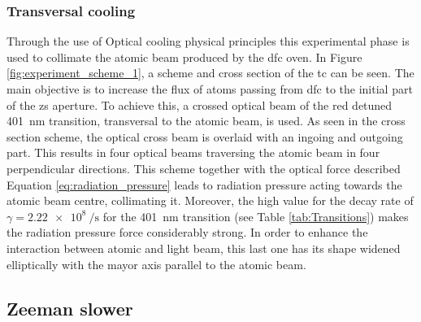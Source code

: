 \subsubsection{Transversal cooling}

Through the use of Optical cooling physical principles this experimental phase is used to collimate the atomic beam produced by the \ac{dfc} oven. In Figure \ref{fig:experiment_scheme_1}, a scheme and cross section of the \ac{tc} can be seen. The main objective is to increase the flux of atoms passing from \ac{dfc} to the initial part of the \ac{zs} aperture. To achieve this, a crossed optical beam of the red detuned \SI{401}{\nano\meter} transition, transversal to the atomic beam, is used. As seen in the cross section scheme, the optical cross beam is overlaid with an ingoing and outgoing part. This results in four optical beams traversing the atomic beam in four perpendicular directions. This scheme together with the optical force described Equation \ref{eq:radiation_pressure} leads to radiation pressure acting towards the atomic beam centre, collimating it. Moreover, the high value for the decay rate of $\gamma = \SI{2.22e8}{\per\second}$ for the \SI{401}{\nano\meter} transition (see Table \ref{tab:Transitions}) makes the radiation pressure force considerably strong. In order to enhance the interaction between atomic and light beam, this last one has its shape widened elliptically with the mayor axis parallel to the atomic beam.


\subsection{Zeeman slower}



